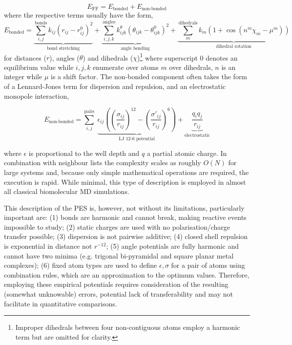 \documentclass[main.tex]{subfiles}
\begin{document}
\begin{equation}
	E_\text{FF} = E_\text{bonded} + E_\text{non-bonded}
\end{equation}
where the respective terms usually have the form,
\begin{equation}
	E_\text{bonded} = \underbrace{\sum_{i, j}^\text{bonds} k_{ij} (r_{ij} - r_{ij}^0)^2}_\text{bond stretching} + \underbrace{\sum_{i, j, k}^\text{angles} k^\theta_{ijk} (\theta_{ijk} - \theta_{ijk}^0)^2}_\text{angle bending} + \underbrace{\sum_{m}^\text{dihedrals} k_m (1 + \cos(n^m \chi_m - \mu^m))}_\text{dihedral rotation}
\end{equation}
for distances ($r$), angles ($\theta$) and dihedrals ($\chi$)\footnote{Improper dihedrals between four non-contiguous atoms employ a harmonic term but are omitted for clarity.} where superscript 0 denotes an equilibrium value while $i,j,k$ enumerate over atoms $m$ over dihedrals, $n$ is an integer while $\mu$ is a shift factor. The non-bonded component often takes the form of a Lennard-Jones term for dispersion and repulsion, and an electrostatic monopole interaction,

\begin{equation}
	E_\text{non-bonded} = \sum_{i, j}^\text{pairs} \; \underbrace{\epsilon_{ij} \left( \left(\frac{\sigma_{ij}}{r_{ij}}\right)^{12} - \left(\frac{\sigma'_{ij}}{r_{ij}}\right)^6 \right)}_\text{LJ 12-6 potential} + \underbrace{\frac{q_i q_j}{r_{ij}}}_\text{electrostatic}
\end{equation}

where $\epsilon$ is proportional to the well depth and $q$ a partial atomic charge.\cite{Guvench2008} In combination with neighbour lists the complexity scales as roughly $O(N)$ for large systems and, because only simple mathematical operations are required, the execution is rapid. While minimal, this type of description is employed in almost all classical biomolecular MD simulations.\cite{Schlick2021}

This description of the PES is, however, not without its limitations, particularly important are: (1) bonds are harmonic and cannot break, making reactive events impossible to study; (2) static charges are used with no polarisation/charge transfer possible; (3) dispersion is not pairwise additive; (4) closed shell repulsion is exponential in distance not $r^{-12}$; (5) angle potentials are fully harmonic and cannot have two minima (e.g. trigonal bi-pyramidal and square planar metal complexes); (6) fixed atom types are used to define $\epsilon, \sigma$ for a pair of atoms using combination rules, which are an approximation to the optimum values.\cite{Boda2008} Therefore, employing these empirical potentials requires consideration of the resulting (somewhat unknowable) errors, potential lack of transferability and may not facilitate in quantitative comparisons.\cite{Harrison2018, LewisAtwell2021}
\end{document}
